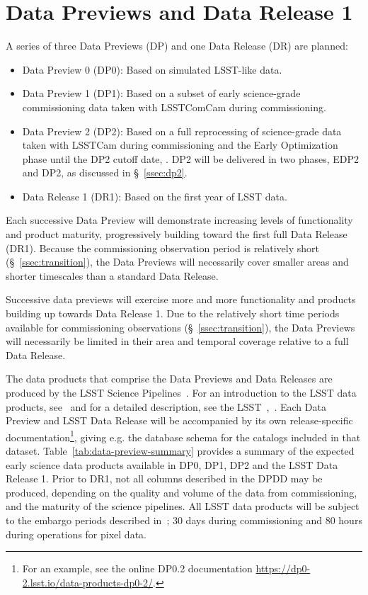 \section{Data Previews and Data Release 1}
\label{sec:datapreview}

A series of three Data Previews (DP) and one Data Release (DR) are planned:
\begin{itemize}
\item Data Preview 0 (DP0): Based on simulated LSST-like data.
\item Data Preview 1 (DP1): Based on a subset of early science-grade commissioning data taken with LSSTComCam during commissioning.
\item Data Preview 2 (DP2): Based on a full reprocessing of science-grade data taken with LSSTCam during commissioning and the Early Optimization phase until  the DP2 cutoff date, \dptwocutoffdate.
DP2 will be delivered in two phases, EDP2 and DP2, as discussed in \S~\ref{ssec:dp2}.
\item Data Release 1 (DR1): Based on the first year of LSST data.
\end{itemize}
Each successive Data Preview will demonstrate increasing levels of functionality and product maturity, progressively building toward the first full Data Release (DR1).
Because the commissioning observation period is relatively short (\S~\ref{ssec:transition}), the Data Previews will necessarily cover smaller areas and shorter timescales than a standard Data Release.

Successive data previews will exercise more and more functionality and products building up towards Data Release 1.
Due to the relatively short time periods available for commissioning observations (\S~\ref{ssec:transition}), the Data Previews will necessarily be limited in their area and temporal coverage relative to a full Data Release.

The data products that comprise the Data Previews and Data Releases are produced by the LSST Science Pipelines~\citep[][]{2019ASPC..523..521B,2018PASJ...70S...5B}.
For an introduction to the LSST data products, see~\citet[][]{RubinDataProductsAbridged} and for a detailed description, see the LSST~\dpdd{},~.
Each Data Preview and LSST Data Release will be accompanied by its own release-specific documentation\footnote{For an example, see the online DP0.2 documentation {\url{https://dp0-2.lsst.io/data-products-dp0-2/}}.}, giving e.g. the  database schema for the catalogs included in that dataset.
Table~\ref{tab:data-preview-summary} provides a summary of the expected early science data products available in DP0, DP1, DP2 and the LSST Data Release 1.
Prior to DR1, not all columns described in the DPDD may be produced, depending on the quality and volume of the data from commissioning, and the maturity of the science pipelines.
All LSST data products will be subject to the embargo periods described in~; 30 days during commissioning and 80 hours during operations for pixel data.


